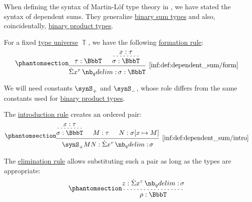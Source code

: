 \begin{definition}\label{def:dependent_sum}
  When defining the syntax of Martin-L\"of type theory in , we have stated the syntax of dependent sums. They generalize \hyperref[def:simple_sum_type]{binary sum types} and also, coincidentally, \hyperref[def:simple_product_type]{binary product types}.

  For a fixed \hyperref[con:type_universe]{type universe} \( \BbbT \), we have the following \hyperref[rem:type_theory_rule_classification/form]{formation rule}:
  \begin{equation*}\taglabel[\ensuremath{ \Sigma_{\logic{form}} }]{inf:def:dependent_sum/form}
    \begin{prooftree}
      \hypo{ \tau: \BbbT }

      \hypo{ x: \tau }
      \infer[dashed]1{ \sigma: \BbbT }

      \infer2[\ref{inf:def:dependent_sum/form}]{ \qsum {x^\tau} \sigma: \BbbT }
    \end{prooftree}
  \end{equation*}

  We will need constants \( \synS_+ \) and \( \synS_- \), whose role differs from the same constants used for \hyperref[def:simple_product_type]{binary product types}.

  The \hyperref[rem:type_theory_rule_classification/intro]{introduction rule} creates an ordered pair:
  \begin{equation*}\taglabel[\ensuremath{ \Sigma_+ }]{inf:def:dependent_sum/intro}
    \begin{prooftree}
      \hypo{ x: \tau }
      \infer[dashed]1{ \sigma: \BbbT }

      \hypo{ M: \tau }
      \hypo{ N: \sigma[x \mapsto M] }

      \infer3[\ref{inf:def:dependent_sum/intro}]{ \synS_+ M N: \qsum {x^\tau} \sigma }
    \end{prooftree}
  \end{equation*}

  The \hyperref[rem:type_theory_rule_classification/elim]{elimination rule} allows substituting such a pair as long as the types are appropriate:
  \begin{equation*}\taglabel[\ensuremath{ \Sigma_- }]{inf:def:dependent_sum/elim}
    \begin{prooftree}
      \hypo{ z: \qsum {x^\tau} \sigma }
      \infer[dashed]1{ \rho: \BbbT }


\end{prooftree}
\end{equation*}
\end{definition}
